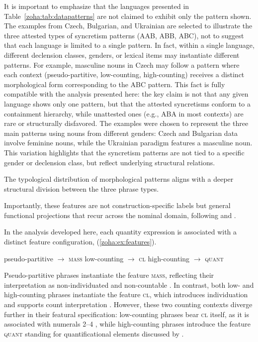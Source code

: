 \documentclass[output=paper,colorlinks,citecolor=brown
]{langscibook}
\begin{document}
\noindent It is important to emphasize that the languages presented in Table~\ref{zoha:tab:datapatterns} are not claimed to exhibit only the pattern shown. The examples from Czech, Bulgarian, and Ukrainian are selected to illustrate the three attested types of syncretism patterns (AAB, ABB, ABC), not to suggest that each language is limited to a single pattern. In fact, within a single language, different declension classes, genders, or lexical items may instantiate different patterns. For example, masculine nouns in Czech may follow a pattern where each context (pseudo-partitive, low-counting, high-counting) receives a distinct morphological form corresponding to the ABC pattern. This fact is fully compatible with the analysis presented here: the key claim is not that any given language shows only one pattern, but that the attested syncretisms conform to a containment hierarchy, while unattested ones (e.g., ABA in most contexts) are rare or structurally disfavored. The examples were chosen to represent the three main patterns using nouns from different genders: Czech and Bulgarian data involve feminine nouns, while the Ukrainian paradigm features a masculine noun. This variation highlights that the syncretism patterns are not tied to a specific gender or declension class, but reflect underlying structural relations.

The typological distribution of morphological patterns aligns with a deeper structural division between the three phrase types. 

Importantly, these features are not construction-specific labels but general functional projections that recur across the nominal domain, following \citet{Borer2005} and \citet{Caha2022}.

In the analysis developed here, each quantity expression is associated with a distinct feature configuration, (\ref{zoha:ex:features}).

\ea \label{zoha:ex:features}
    \ea pseudo-partitive $\rightarrow$ \textsc{mass} \label{zoha:ex:mass}
    \ex low-counting $\rightarrow$ \textsc{cl} \label{zoha:ex:cl}
    \ex high-counting $\rightarrow$ \textsc{quant}
    \z
\z

\noindent Pseudo-partitive phrases instantiate the feature \textsc{mass}, reflecting their interpretation as non-individuated and non-countable \citep{Borer2005,chierchia1998,chierchia1998reference}. In contrast, both low- and high-counting phrases instantiate the feature \textsc{cl}, which introduces individuation and supports count interpretation \citep{Borer2005,Caha2022}. However, these two counting contexts diverge further in their featural specification: low-counting phrases bear  \textsc{cl} itself, as it is associated with numerals 2--4 \citep{Pesetsky2013,Franks1995}, while high-counting phrases introduce the feature \textsc{quant} standing for quantificational elements discussed by \citet{Pesetsky2013}.
\end{document}
